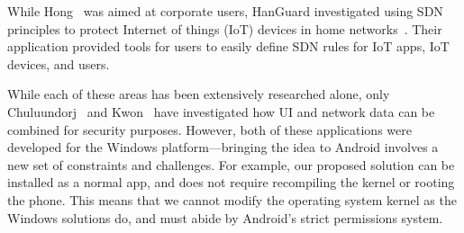 While Hong~\etal \cite{hong2016} was aimed at corporate users, HanGuard investigated using SDN principles to protect Internet of things (IoT) devices in home networks~\cite{demetriou2017}. Their application provided tools for users to easily define SDN rules for IoT apps, IoT devices, and users.

While each of these areas has been extensively researched alone, only Chuluundorj~\cite{chuluundorj2019} and Kwon~\etal \cite{kwon2011} have investigated how UI and network data can be combined for security purposes. However, both of these applications were developed for the Windows platform---bringing the idea to Android involves a new set of constraints and challenges. For example, our proposed solution can be installed as a normal app, and does not require recompiling the kernel or rooting the phone. This means that we cannot modify the operating system kernel as the Windows solutions do, and must abide by Android's strict permissions system.

\newpage
